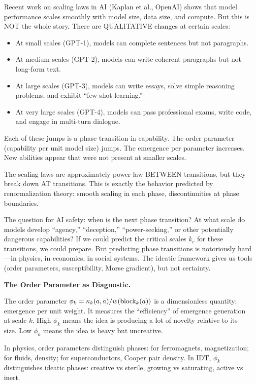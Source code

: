 \begin{interpretation}
Recent work on scaling laws in AI (Kaplan et al., OpenAI) shows that model
performance scales smoothly with model size, data size, and compute. But this
is NOT the whole story. There are QUALITATIVE changes at certain scales:
\begin{itemize}
  \item At small scales (GPT-1), models can complete sentences but not paragraphs.
  \item At medium scales (GPT-2), models can write coherent paragraphs but not
    long-form text.
  \item At large scales (GPT-3), models can write essays, solve simple reasoning
    problems, and exhibit ``few-shot learning.''
  \item At very large scales (GPT-4), models can pass professional exams, write
    code, and engage in multi-turn dialogue.
\end{itemize}

Each of these jumps is a phase transition in capability. The order parameter
(capability per unit model size) jumps. The emergence per parameter increases.
New abilities appear that were not present at smaller scales.

The scaling laws are approximately power-law BETWEEN transitions, but they break
down AT transitions. This is exactly the behavior predicted by renormalization
theory: smooth scaling in each phase, discontinuities at phase boundaries.

The question for AI safety: when is the next phase transition? At what scale
do models develop ``agency,'' ``deception,'' ``power-seeking,'' or other
potentially dangerous capabilities? If we could predict the critical scales $k_c$
for these transitions, we could prepare. But predicting phase transitions is
notoriously hard---in physics, in economics, in social systems. The ideatic
framework gives us tools (order parameters, susceptibility, Morse gradient),
but not certainty.

\textbf{The Order Parameter as Diagnostic.}

The order parameter $\phi_k = \kappa_k(a,a) / w(\text{block}_k(a))$ is
a dimensionless quantity: emergence per unit weight. It measures the ``efficiency''
of emergence generation at scale $k$. High $\phi_k$ means the idea is producing
a lot of novelty relative to its size. Low $\phi_k$ means the idea is heavy but
uncreative.

In physics, order parameters distinguish phases: for ferromagnets, magnetization;
for fluids, density; for superconductors, Cooper pair density. In IDT, $\phi_k$
distinguishes ideatic phases: creative vs sterile, growing vs saturating, active
vs inert.


\end{interpretation}
